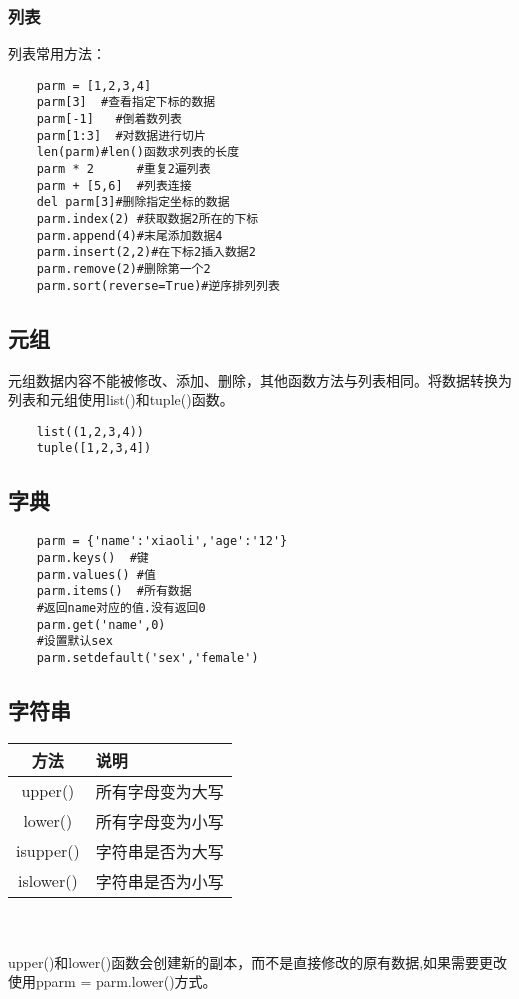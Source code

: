 \documentclass[twocolumn]{article}
\begin{document}
	\subsubsection{列表}
	列表常用方法：
	\begin{lstlisting}
	parm = [1,2,3,4]
	parm[3]  #查看指定下标的数据  
	parm[-1]   #倒着数列表   
	parm[1:3]  #对数据进行切片
	len(parm)#len()函数求列表的长度
	parm * 2      #重复2遍列表
	parm + [5,6]  #列表连接  
	del parm[3]#删除指定坐标的数据
	parm.index(2) #获取数据2所在的下标
	parm.append(4)#末尾添加数据4
	parm.insert(2,2)#在下标2插入数据2
	parm.remove(2)#删除第一个2
	parm.sort(reverse=True)#逆序排列列表
	\end{lstlisting}
	\subsection{元组}
	元组数据内容不能被修改、添加、删除，其他函数方法与列表相同。将数据转换为列表和元组使用list()和tuple()函数。
	\begin{lstlisting}
	list((1,2,3,4))
	tuple([1,2,3,4])
	\end{lstlisting}
	\subsection{字典}
	\begin{lstlisting}
	parm = {'name':'xiaoli','age':'12'}
	parm.keys()  #键
	parm.values() #值
	parm.items()  #所有数据
	#返回name对应的值.没有返回0
	parm.get('name',0)
	#设置默认sex
	parm.setdefault('sex','female')
	\end{lstlisting}
	\subsection{字符串}
	
	\begin{tabular}{|c|p{}|}
		\hline
		方法 & 说明 \\
		\hline
		upper() & 所有字母变为大写 \\
		\hline
		lower() & 所有字母变为小写 \\
		\hline
		isupper() & 字符串是否为大写 \\
		\hline
		islower() & 字符串是否为小写 \\
		\hline
	\end{tabular}
	\\
	\\
	upper()和lower()函数会创建新的副本，而不是直接修改的原有数据,如果需要更改使用pparm = parm.lower()方式。
	\\
	
\end{document}
